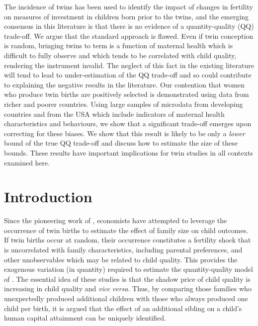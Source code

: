 \begin{chapabstract}
 The incidence of twins has been used to identify the impact of changes in 
 fertility on measures of investment in children born prior to the twins, and
 the emerging consensus in this literature is that there is no evidence of a
 quantity-quality (QQ) trade-off. We argue that the standard approach is 
 flawed. Even if twin conception is random, bringing twins to term is a function 
 of maternal health which is difficult to fully observe and which tends to be
 correlated with child quality, rendering the instrument invalid. The neglect
 of this fact in the existing literature will tend to lead to under-estimation 
 of the QQ trade-off and so could contribute to explaining the negative results
 in the literature. Our contention that women who produce twin births are
 positively selected is demonstrated using data from richer and poorer countries.
 Using large samples of microdata from developing countries and from the USA 
 which include indicators of maternal health characteristics and behaviours, we
 show that a significant trade-off emerges upon correcting for these biases. We
 show that this result is likely to be only a \emph{lower} bound of the true
 QQ trade-off and discuss how to estimate the size of these bounds. These
 results have important implications for twin studies in all contexts examined
 here.
\end{chapabstract}



\section{Introduction}                             \label{TWINscn:intro}
Since the pioneering work of \citet{RosenzweigWolpin1980}, economists have 
attempted to leverage the occurrence of twin births to estimate the effect of 
family size on child outcomes. If twin births occur at random, their occurrence 
constitutes a fertility shock that is uncorrelated with family characteristics, 
including parental preferences, and other unobservables which may be related to 
child quality. This provides the exogenous variation (in quantity) required to 
estimate the quantity-quality model of \citet{Becker1960,BeckerLewis1973,
BeckerTomes1976}.  The essential idea of these studies is that the shadow price 
of child quality is increasing in child quality and \emph{vice versa}. Thus, by 
comparing those families who unexpectedly produced additional children with 
those who always produced one child per birth, it is argued that the effect of 
an additional sibling on a child's human capital attainment can be uniquely
identified.

